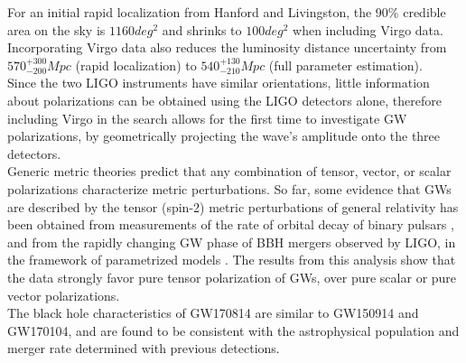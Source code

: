 \documentclass[binding=0.6cm, LaM]{sapthesis}
\begin{document}
	For an initial rapid localization from Hanford and Livingston, 
	the 90\% credible area on the sky is $1160 deg^2$ and shrinks to $100 deg^2$ when including Virgo data. 
	Incorporating Virgo data also reduces the luminosity distance uncertainty from 
	$570^{+300}_{-200}Mpc$ (rapid localization) to $540^{+130}_{-210} Mpc$ (full parameter estimation). \\
	 Since the two LIGO instruments have similar orientations, little information about polarizations 
	can be obtained using the LIGO detectors alone, therefore including Virgo in the search 
	allows for the first time to investigate GW polarizations, by geometrically 
	projecting the wave’s amplitude onto the three detectors. \\
	Generic metric theories predict that any combination of tensor, vector, or scalar 
	polarizations \cite{171,172} characterize metric perturbations.
	So far, some evidence that GWs are described by the tensor (spin-2) metric perturbations 
	of general relativity has been obtained from measurements of the rate of orbital decay of binary pulsars \cite{173,176}, 
	and from the rapidly changing GW phase of BBH mergers observed by LIGO, in the framework of parametrized models \cite{52,57,60}. 
	The results from this analysis show that the data strongly favor
	pure tensor polarization of GWs, over pure scalar or pure vector polarizations. \\
	The black hole characteristics of GW170814 are similar to GW150914 and GW170104, 
	and are found to be consistent with the astrophysical population and merger rate determined with previous detections.
\end{document}

